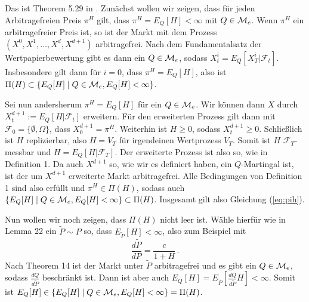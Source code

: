 \documentclass{article}
\begin{document}
Das ist Theorem 5.29 in \cite{foellmer2016}.
Zunächst wollen wir zeigen, dass für jeden Arbitragefreien Preis $\pi^H$ gilt, dass $\pi^H=E_Q[H]<\infty$ mit $Q\in{\cal M}_e$.
Wenn $\pi^H$ ein arbitragefreier Preis ist, so ist der Markt mit dem Prozess $(X^0,X^1,\dots,X^d,X^{d+1})$ arbitragefrei.
Nach dem Fundamentalsatz der Wertpapierbewertung gibt es dann ein $Q\in{\cal M}_e$, sodass $X^i_t=E_Q[X^i_T|\mathscr{F}_t]$.
Insbesondere gilt dann für $i=0$, dass $\pi^H=E_Q[H]$, also ist $\Pi(H)\subset\{E_Q[H]\mid Q\in{\cal M}_e, E_Q[H]<\infty\}$.

Sei nun andersherum $\pi^H=E_Q[H]$ für ein $Q\in{\cal M}_e$.
Wir können dann $X$ durch $X^{d+1}_t:=E_Q[H|\mathscr{F}_t]$ erweitern.
Für den erweiterten Prozess gilt dann mit $\mathscr{F}_0=\{\emptyset,\Omega\}$, dass $X^{d+1}_0=\pi^H$.
Weiterhin ist $H\geq0$, sodass $X^{d+1}_t\geq0$.
Schließlich ist $H$ replizierbar, also $H=V_T$ für irgendeinen Wertprozess $V_T$.
Somit ist $H$ $\mathscr{F}_T$-messbar und $H=E_Q[H|\mathscr{F}_T]$.
Der erweiterte Prozess ist also so, wie in Definition 1.
Da auch $X^{d+1}$ so, wie wir es definiert haben, ein $Q$-Martingal ist, ist der um $X^{d+1}$ erweiterte Markt arbitragefrei.
Alle Bedingungen von Definition 1 sind also erfüllt und $\pi^H\in \Pi(H)$, sodass auch $\{E_Q[H]\mid Q\in{\cal M}_e, E_Q[H]<\infty\}\subset\Pi(H)$.
Insgesamt gilt also Gleichung (\ref{eq:pih}).

Nun wollen wir noch zeigen, dass $\Pi(H)$ nicht leer ist.
Wähle hierfür wie in Lemma 22 ein $\widetilde{P}\sim P$ so, dass $E_{\widetilde{P}}[H]<\infty$, also zum Beispiel mit
\[\frac{d\widetilde{P}}{dP}=\frac{c}{1+H}\,.\]
Nach Theorem 14 ist der Markt unter $\widetilde{P}$ arbitragefrei und es gibt ein $Q\in{\cal M}_e$, sodass $\frac{d Q}{d\widetilde{P}}$ beschränkt ist. Dann ist aber auch $E_Q[H]=E_{\widetilde{P}}\left[\frac{d Q}{d\widetilde{P}}H\right]<\infty$.
Somit ist $E_Q[H]\in\{E_Q[H]\mid Q\in{\cal M}_e, E_Q[H]<\infty\}=\Pi(H)$.
\end{document}
